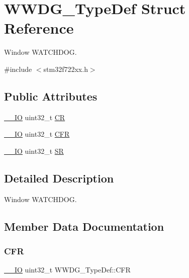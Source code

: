 \hypertarget{struct_w_w_d_g___type_def}{}\section{W\+W\+D\+G\+\_\+\+Type\+Def Struct Reference}
\label{struct_w_w_d_g___type_def}


Window W\+A\+T\+C\+H\+D\+OG.  




{\ttfamily \#include $<$stm32f722xx.\+h$>$}

\subsection*{Public Attributes}
\begin{DoxyCompactItemize}
\item 
\mbox{\hyperlink{core__sc300_8h_aec43007d9998a0a0e01faede4133d6be}{\+\_\+\+\_\+\+IO}} uint32\+\_\+t \mbox{\hyperlink{struct_w_w_d_g___type_def_a4caf530d45f7428c9700d9c0057135f8}{CR}}
\item 
\mbox{\hyperlink{core__sc300_8h_aec43007d9998a0a0e01faede4133d6be}{\+\_\+\+\_\+\+IO}} uint32\+\_\+t \mbox{\hyperlink{struct_w_w_d_g___type_def_adcd6a7e5d75022e46ce60291f4b8544c}{C\+FR}}
\item 
\mbox{\hyperlink{core__sc300_8h_aec43007d9998a0a0e01faede4133d6be}{\+\_\+\+\_\+\+IO}} uint32\+\_\+t \mbox{\hyperlink{struct_w_w_d_g___type_def_a15655cda4854cc794db1f27b3c0bba38}{SR}}
\end{DoxyCompactItemize}


\subsection{Detailed Description}
Window W\+A\+T\+C\+H\+D\+OG. 

\subsection{Member Data Documentation}
\mbox{\label{struct_w_w_d_g___type_def_adcd6a7e5d75022e46ce60291f4b8544c}} 
\subsubsection{\texorpdfstring{CFR}{CFR}}
{\footnotesize\ttfamily \mbox{\hyperlink{core__sc300_8h_aec43007d9998a0a0e01faede4133d6be}{\+\_\+\+\_\+\+IO}} uint32\+\_\+t W\+W\+D\+G\+\_\+\+Type\+Def\+::\+C\+FR}

